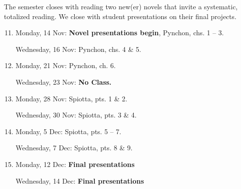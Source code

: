   The semester closes with reading two new(er) novels that invite a systematic,
  totalized reading. We close with student presentations on their final
  projects.

\begin{enumerate}
  \setcounter{enumi}{10}

  \item Monday, 14 Nov: \textbf{\small Novel presentations begin}, Pynchon, chs. 1 -- 3.
  
    Wednesday, 16 Nov: Pynchon, chs. 4 \& 5.

  \item Monday, 21 Nov: Pynchon, ch. 6.

    Wednesday, 23 Nov: \textbf{No Class.}

  \item Monday, 28 Nov: Spiotta, pts. 1 \& 2.

  Wednesday, 30 Nov: Spiotta, pts. 3 \& 4.

  \item Monday, 5 Dec: Spiotta, pts. 5 -- 7.

  Wednesday, 7 Dec: Spiotta, pts. 8 \& 9.

  \item Monday, 12 Dec: \textbf{\small Final presentations}
  
  Wednesday, 14 Dec: \textbf{\small Final presentations}

\end{enumerate}
